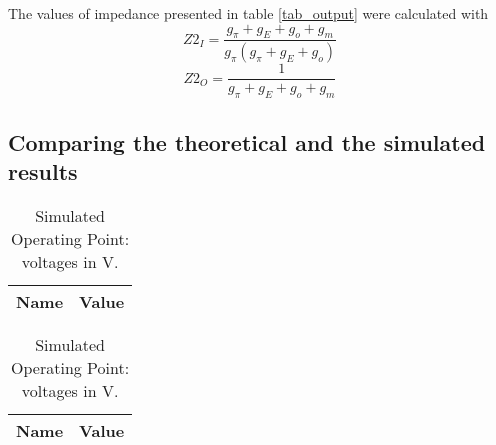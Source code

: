 The values of impedance presented in table \ref{tab_output} were calculated with
\begin{equation}
    Z2_I=\frac{g_{\pi}+g_{E}+g_{o}+g_{m}}{g_{\pi}(g_{\pi}+g_{E}+g_{o})}
\end{equation}
\begin{equation}
    Z2_O=\frac{1}{g_{\pi}+g_{E}+g_{o}+g_{m}}
\end{equation}

\subsection{Comparing the theoretical and the simulated results}

\begin{table}[H]
\parbox{.5\linewidth}{
\centering                
\def\arraystretch{1}        %

\begin{tabular}{c|c}        %
\hline                      %

\textbf{Name}  & \textbf{Value}\\     
\hline                      %

\hline                      %
\end{tabular}
\captionsetup{justification=justified, margin=0.5cm} 
\caption{Theoretical Operating Point: voltages in V.}
\label{tab7}
}
\hfill
\parbox{.5\linewidth}{
\centering
\def\arraystretch{1}

\begin{tabular}{c|c}
\hline    
\textbf{Name} & \textbf{Value} \\ \hline

\hline
\end{tabular}
\captionsetup{justification=justified, margin=0.5cm} 
\caption{Simulated Operating Point: voltages in V.}
\label{tab8}
}
\end{table}

